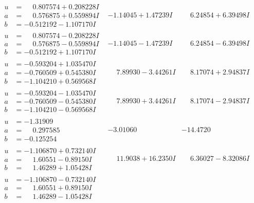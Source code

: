 \documentclass[1p]{elsarticle_modified}
\theoremstyle{definition}
\begin{document}
$$\begin{array}{c|c|c}
\begin{aligned}
u &= \phantom{-}0.807574 + 0.208228 I \\
a &= \phantom{-}0.576875 + 0.559894 I \\
b &= -0.512192 - 1.107170 I\end{aligned}
 & -1.14045 + 1.47239 I & \phantom{-}6.24854 + 6.39498 I \\ \hline\begin{aligned}
u &= \phantom{-}0.807574 - 0.208228 I \\
a &= \phantom{-}0.576875 - 0.559894 I \\
b &= -0.512192 + 1.107170 I\end{aligned}
 & -1.14045 - 1.47239 I & \phantom{-}6.24854 - 6.39498 I \\ \hline\begin{aligned}
u &= -0.593204 + 1.035470 I \\
a &= -0.760509 + 0.545380 I \\
b &= -1.104210 + 0.569568 I\end{aligned}
 & \phantom{-}7.89930 - 3.44261 I & \phantom{-}8.17074 + 2.94837 I \\ \hline\begin{aligned}
u &= -0.593204 - 1.035470 I \\
a &= -0.760509 - 0.545380 I \\
b &= -1.104210 - 0.569568 I\end{aligned}
 & \phantom{-}7.89930 + 3.44261 I & \phantom{-}8.17074 - 2.94837 I \\ \hline\begin{aligned}
u &= -1.31909\phantom{ +0.000000I} \\
a &= \phantom{-}0.297585\phantom{ +0.000000I} \\
b &= -0.125254\phantom{ +0.000000I}\end{aligned}
 & -3.01060\phantom{ +0.000000I} & -14.4720\phantom{ +0.000000I} \\ \hline\begin{aligned}
u &= -1.106870 + 0.732140 I \\
a &= \phantom{-}1.60551 - 0.89150 I \\
b &= \phantom{-}1.46289 + 1.05428 I\end{aligned}
 & \phantom{-}11.9038 + 16.2350 I & \phantom{-}6.36027 - 8.32086 I \\ \hline\begin{aligned}
u &= -1.106870 - 0.732140 I \\
a &= \phantom{-}1.60551 + 0.89150 I \\
b &= \phantom{-}1.46289 - 1.05428 I\end{aligned}

\end{array}$$
\end{document}
